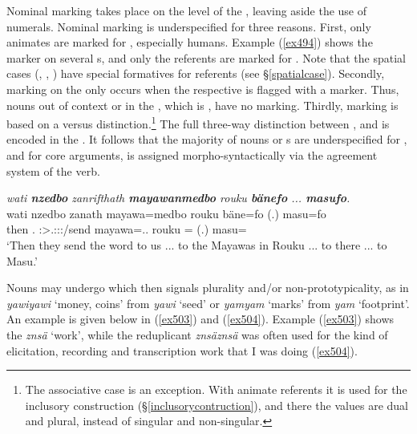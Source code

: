 Nominal  marking takes place on the level of the , leaving aside the use of numerals. Nominal  marking is underspecified for three reasons. First, only animates are marked for , especially humans. Example (\ref{ex494}) shows the   marker on several s, and only the  referents are marked for . Note that the spatial cases (, , ) have special formatives for  referents (see \S{}\ref{spatialcase}). Secondly,  marking on the  only occurs when the respective  is flagged with a  marker. Thus, nouns out of context or  in the  , which is , have no   marking. Thirdly,   marking is based on a  versus  distinction.\footnote{The associative case is an exception. With animate referents it is used for the inclusory construction (\S{}\ref{inclusorycontruction}), and there the values are dual and plural, instead of singular and non-singular.} The full three-way distinction between ,  and  is encoded in the . It follows that the majority of nouns or s are underspecified for , and for core  arguments,  is assigned morpho-syntactically via the agreement system of the verb.

\begin{exe}
	\ex \emph{wati \textbf{nzedbo} zanrifthath \textbf{mayawanmedbo} rouku \textbf{bänefo} ... \textbf{masufo}.}\\
	\gll wati nzedbo zanath mayawa=medbo rouku bäne=fo (.) masu=fo\\
	then \Fnsg.\All{} \Stpl:\Sbj>\Tsg.\F:\Obj:\Pst:\Pfv/send mayawa=\All.\Anim.\Nsg{} rouku \Recog=\All{} (.) masu=\All{}\\
	\trans `Then they send the word to us ... to the Mayawas in Rouku ... to there ... to Masu.'
	\label{ex494}
\end{exe}

Nouns may undergo  which then signals plurality and/or non-prototypicality, as in \emph{yawiyawi} `money, coins' from \emph{yawi} `seed' or \emph{yamyam} `marks' from \emph{yam} `footprint'. An example is given below in (\ref{ex503}) and (\ref{ex504}). Example (\ref{ex503}) shows the  \emph{znsä} `work', while the reduplicant \emph{znsäznsä} was often used for the kind of elicitation, recording and transcription work that I was doing (\ref{ex504}).

